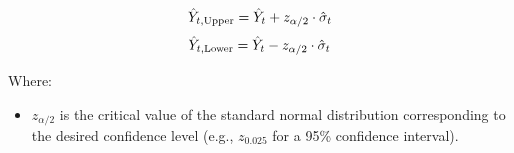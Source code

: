 \documentclass[11pt,preprint, authoryear]{elsarticle}
\numberwithin{equation}{section}
\numberwithin{figure}{section}
\numberwithin{table}{section}
\def\tightlist{} %
\begin{document}
\[
\hat{Y}_{t, \text{Upper}} = \hat{Y}_t + z_{\alpha/2} \cdot \hat{\sigma}_t \\
\] \[
\hat{Y}_{t, \text{Lower}} = \hat{Y}_t - z_{\alpha/2} \cdot \hat{\sigma}_t \\
\]

Where:

\begin{itemize}
\tightlist
\item
  \(z_{\alpha/2}\) is the critical value of the standard normal
  distribution corresponding to the desired confidence level (e.g.,
  \(z_{0.025}\) for a 95\% confidence interval).
\end{itemize}


\end{document}
